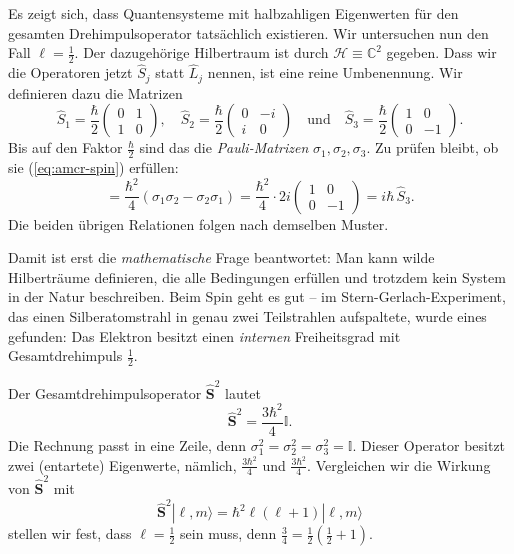 Es zeigt sich, dass Quantensysteme mit halbzahligen Eigenwerten für den gesamten Drehimpulsoperator tatsächlich existieren. Wir untersuchen nun den Fall $\ell = \frac12$. Der dazugehörige Hilbertraum ist durch $\mathcal{H} \equiv \mathbb{C}^2$ gegeben. Dass wir die Operatoren jetzt $\widehat{S}_j$ statt $\widehat{L}_j$ nennen, ist eine reine Umbenennung. Wir definieren dazu die Matrizen
\begin{equation}
	\widehat{S}_1 = \frac{\hbar}{2} \begin{pmatrix}
		0 & 1 \\ 1 & 0
	\end{pmatrix}, \quad \widehat{S}_2 = \frac{\hbar}{2} \begin{pmatrix}
		0 & -i \\ i & 0
	\end{pmatrix} \quad \text{und} \quad \widehat{S}_3 = \frac{\hbar}{2} \begin{pmatrix}
		1 & 0 \\ 0 & -1
	\end{pmatrix}.
\end{equation}
Bis auf den Faktor $\frac{\hbar}{2}$ sind das die \emph{Pauli-Matrizen} $\sigma_1,\sigma_2,\sigma_3$. Zu prüfen bleibt, ob sie (\ref{eq:amcr-spin}) erfüllen:
\begin{equation}
	[\widehat{S}_1,\widehat{S}_2] = \frac{\hbar^2}{4}\left(\sigma_1\sigma_2-\sigma_2\sigma_1\right) = \frac{\hbar^2}{4}\cdot 2i \begin{pmatrix}
		1 & 0 \\ 0 & -1
	\end{pmatrix} = i\hbar\, \widehat{S}_3.
\end{equation}
Die beiden übrigen Relationen folgen nach demselben Muster.

\begin{historical}
	Damit ist erst die \emph{mathematische} Frage beantwortet: Man kann wilde Hilberträume definieren, die alle Bedingungen erfüllen und trotzdem kein System in der Natur beschreiben. Beim Spin geht es gut -- im Stern-Gerlach-Experiment, das einen Silberatomstrahl in genau zwei Teilstrahlen aufspaltete, wurde eines gefunden: Das Elektron besitzt einen \emph{internen} Freiheitsgrad mit Gesamtdrehimpuls $\frac12$.
\end{historical}

Der Gesamtdrehimpulsoperator $\widehat{\mathbf{S}}^2$ lautet
\begin{equation}
	\widehat{\mathbf{S}}^2 = \frac{3\hbar^2}{4} \mathbb{I}.
\end{equation}
Die Rechnung passt in eine Zeile, denn $\sigma_1^2 = \sigma_2^2 = \sigma_3^2 = \mathbb{I}$. Dieser Operator besitzt zwei (entartete) Eigenwerte, nämlich, $\frac{3\hbar^2}{4}$ und $\frac{3\hbar^2}{4}$. Vergleichen wir die Wirkung von $\widehat{\mathbf{S}}^2$ mit
\begin{equation}
	\widehat{\mathbf{S}}^2|\ell,m\rangle = \hbar^2\ell(\ell+1)|\ell,m\rangle
\end{equation}
stellen wir fest, dass $\ell=\frac12$ sein muss, denn $\frac34 = \frac12\left(\frac12+1\right)$.


